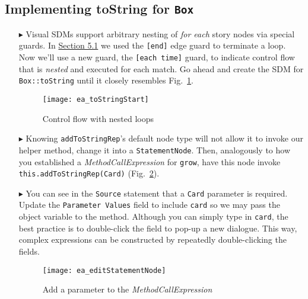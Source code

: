 \newpage
\hypertarget{stringRep vis}{}
\subsection{Implementing toString for \texttt{Box}}
\visHeader

\begin{itemize}

\item[$\blacktriangleright$] Visual SDMs support arbitrary nesting of \emph{for each} story nodes via special guards. In \hyperlink{emptyPartition vis}{Section
5.1} we used the \texttt{[end]} edge guard to terminate a loop. Now we'll use a new guard, the \texttt{[each time]} guard, to indicate
control flow that is \emph{nested} and executed for each match. Go ahead and create the SDM for \texttt{Box::toString} until it closely resembles
Fig.~\ref{ea:sdm_tostring_1}.

\begin{figure}[htbp]
\begin{center}
  \texttt{[image: ea\_toStringStart]}
  \caption{Control flow with nested loops} 
  \label{ea:sdm_tostring_1}
\end{center}
\end{figure}

\clearpage

\item[$\blacktriangleright$] Knowing \texttt{addToStringRep}'s default node type will not allow it to invoke our helper method, change it
into a \texttt{StatementNode}. Then, analogously to how you established a \emph{MethodCallExpression} for \texttt{grow}, have this node invoke
\texttt{this.addToStringRep(Card)} (Fig.~\ref{ea:editStatement}). 

\vspace{0.5cm}

\item[$\blacktriangleright$] You can see in the \texttt{Source} statement that a \texttt{Card} parameter is required. Update the \texttt{Parameter Values}
field to include \texttt{card} so we may pass the object variable to the method. Although you can simply type in \texttt{card}, the best practice is to
double-click the field to pop-up a new dialogue. This way, complex expressions can be constructed by repeatedly double-clicking the fields.

\vspace{0.5cm}

\begin{figure}[htbp]
\begin{center}
  \texttt{[image: ea\_editStatementNode]}
  \caption{Add a parameter to the \emph{MethodCallExpression}}
  \label{ea:editStatement}
\end{center}
\end{figure}


\end{itemize}
